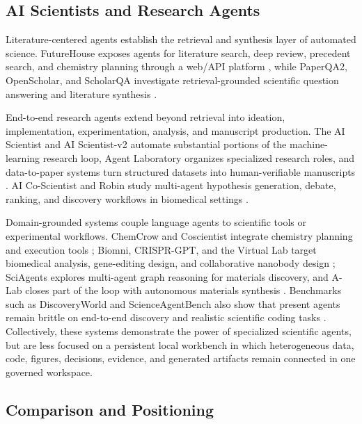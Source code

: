 \documentclass[sn-basic,Numbered,pdflatex]{sn-jnl}
\begin{document}
\subsection{AI Scientists and Research Agents}

Literature-centered agents establish the retrieval and synthesis layer of automated science. FutureHouse exposes agents for literature search, deep review, precedent search, and chemistry planning through a web/API platform \cite{futureHousePlatform2025}, while PaperQA2, OpenScholar, and ScholarQA investigate retrieval-grounded scientific question answering and literature synthesis \cite{paperQA2024,openScholar2024,scholarQA2025}.

End-to-end research agents extend beyond retrieval into ideation, implementation, experimentation, analysis, and manuscript production. The AI Scientist and AI Scientist-v2 automate substantial portions of the machine-learning research loop, Agent Laboratory organizes specialized research roles, and data-to-paper systems turn structured datasets into human-verifiable manuscripts \cite{sakanaAIScientist2024,yamada2025aiscientistv2,agentLaboratory2025,ifargan2025datatopaper}. AI Co-Scientist and Robin study multi-agent hypothesis generation, debate, ranking, and discovery workflows in biomedical settings \cite{googleCoScientist2025,ghareeb2026robin}.

Domain-grounded systems couple language agents to scientific tools or experimental workflows. ChemCrow and Coscientist integrate chemistry planning and execution tools \cite{bran2024chemcrow,boiko2023coscientist}; Biomni, CRISPR-GPT, and the Virtual Lab target biomedical analysis, gene-editing design, and collaborative nanobody design \cite{huang2025biomni,qu2026crisprgpt,swanson2025virtuallab}; SciAgents explores multi-agent graph reasoning for materials discovery, and A-Lab closes part of the loop with autonomous materials synthesis \cite{ghafarollahi2025sciagents,szymanski2023alab}. Benchmarks such as DiscoveryWorld and ScienceAgentBench also show that present agents remain brittle on end-to-end discovery and realistic scientific coding tasks \cite{jansen2024discoveryworld,chen2025scienceagentbench}. Collectively, these systems demonstrate the power of specialized scientific agents, but are less focused on a persistent local workbench in which heterogeneous data, code, figures, decisions, evidence, and generated artifacts remain connected in one governed workspace.

\subsection{Comparison and Positioning}
\end{document}
